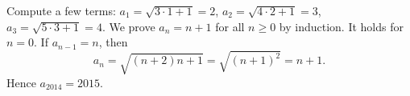 Compute a few terms: $a_1=\sqrt{3\cdot1+1}=2$, $a_2=\sqrt{4\cdot2+1}=3$, $a_3=\sqrt{5\cdot3+1}=4$. We prove $a_n=n+1$ for all $n\ge0$ by induction. It holds for $n=0$. If $a_{n-1}=n$, then
\[
a_n=\sqrt{(n+2)n+1}=\sqrt{(n+1)^2}=n+1 .
\]
Hence $a_{2014}=\boxed{2015}$.
